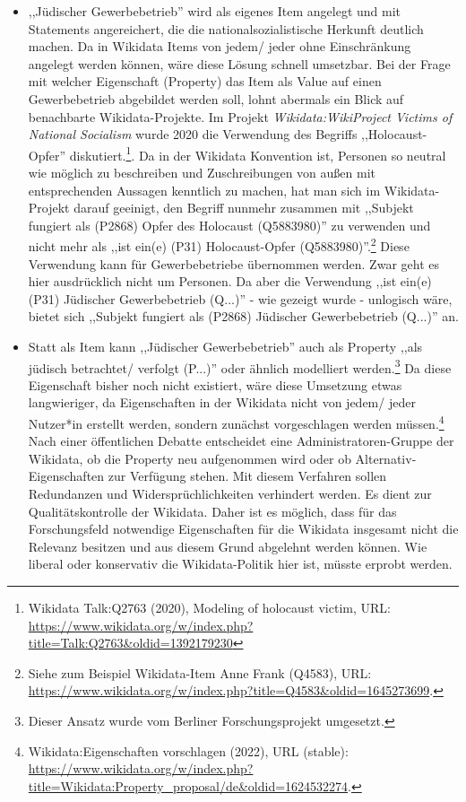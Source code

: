 \begin{itemize}
    \item ,,Jüdischer Gewerbebetrieb'' wird als eigenes Item angelegt und mit Statements angereichert, die die nationalsozialistische Herkunft deutlich machen. Da in Wikidata Items von jedem/ jeder ohne Einschränkung angelegt werden können, wäre diese Lösung schnell umsetzbar. Bei der Frage mit welcher Eigenschaft (Property) das Item als Value auf einen Gewerbebetrieb abgebildet werden soll, lohnt abermals ein Blick auf benachbarte Wikidata-Projekte. Im Projekt \textit{Wikidata:WikiProject Victims of National Socialism} wurde 2020 die Verwendung des Begriffs ,,Holocaust-Opfer'' diskutiert.\footnote{Wikidata Talk:Q2763 (2020), Modeling of holocaust victim, URL: \url{https://www.wikidata.org/w/index.php?title=Talk:Q2763&oldid=1392179230}}. Da in der Wikidata Konvention ist, Personen so neutral wie möglich zu beschreiben und Zuschreibungen von außen mit entsprechenden Aussagen kenntlich zu machen, hat man sich im Wikidata-Projekt darauf geeinigt, den Begriff nunmehr zusammen mit ,,Subjekt fungiert als (P2868) Opfer des Holocaust (Q5883980)'' zu verwenden und nicht mehr als ,,ist ein(e) (P31) Holocaust-Opfer (Q5883980)''.\footnote{Siehe zum Beispiel Wikidata-Item Anne Frank (Q4583), URL: \url{https://www.wikidata.org/w/index.php?title=Q4583&oldid=1645273699}.} Diese Verwendung kann für Gewerbebetriebe übernommen werden. Zwar geht es hier ausdrücklich nicht um Personen. Da aber die Verwendung ,,ist ein(e) (P31) Jüdischer Gewerbebetrieb (Q...)'' - wie gezeigt wurde - unlogisch wäre, bietet sich ,,Subjekt fungiert als (P2868) Jüdischer Gewerbebetrieb (Q...)'' an.
    \item Statt als Item kann ,,Jüdischer Gewerbebetrieb'' auch als Property ,,als jüdisch betrachtet/ verfolgt (P...)'' oder ähnlich modelliert werden.\footnote{Dieser Ansatz wurde vom Berliner Forschungsprojekt umgesetzt.} Da diese Eigenschaft bisher noch nicht existiert, wäre diese Umsetzung etwas langwieriger, da Eigenschaften in der Wikidata nicht von jedem/ jeder Nutzer*in erstellt werden, sondern zunächst vorgeschlagen werden müssen.\footnote{Wikidata:Eigenschaften vorschlagen (2022), URL (stable): \url{https://www.wikidata.org/w/index.php?title=Wikidata:Property_proposal/de&oldid=1624532274}.} Nach einer öffentlichen Debatte entscheidet eine Administratoren-Gruppe der Wikidata, ob die Property neu aufgenommen wird oder ob Alternativ-Eigenschaften zur Verfügung stehen. Mit diesem Verfahren sollen Redundanzen und Widersprüchlichkeiten verhindert werden. Es dient zur Qualitätskontrolle der Wikidata. Daher ist es möglich, dass für das Forschungsfeld notwendige Eigenschaften für die Wikidata insgesamt nicht die Relevanz besitzen und aus diesem Grund abgelehnt werden können. Wie liberal oder konservativ die Wikidata-Politik hier ist, müsste erprobt werden.      
\end{itemize} 

